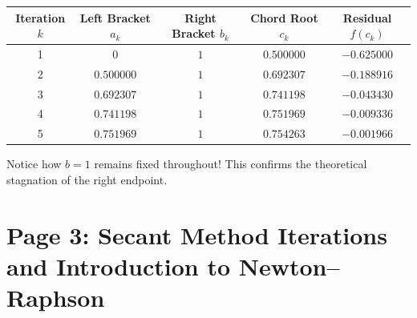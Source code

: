 \begin{examplebox}[Step-by-Step Regula-Falsi Iterations for $f(x) = x^3 + x^2 - 1 = 0$]
\begin{center}
\small
\renewcommand{\arraystretch}{1.2}
\begin{tabular}{|c|c|c|c|c|}
\hline
\textbf{Iteration $k$} & \textbf{Left Bracket $a_k$} & \textbf{Right Bracket $b_k$} & \textbf{Chord Root $c_k$} & \textbf{Residual $f(c_k)$} \\
\hline
1 & $0$ & $1$ & $0.500000$ & $-0.625000$ \\
2 & $0.500000$ & $1$ & $0.692307$ & $-0.188916$ \\
3 & $0.692307$ & $1$ & $0.741198$ & $-0.043430$ \\
4 & $0.741198$ & $1$ & $0.751969$ & $-0.009336$ \\
5 & $0.751969$ & $1$ & $0.754263$ & $-0.001966$ \\
\hline
\end{tabular}
\end{center}
Notice how $b = 1$ remains fixed throughout! This confirms the theoretical stagnation of the right endpoint.
\end{examplebox}

\section{Page 3: Secant Method Iterations and Introduction to Newton--Raphson}
\label{sec:page3_secant_table}

